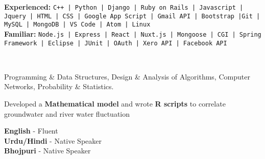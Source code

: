 \documentclass[8pt]{developercv} %
\begin{document}
\begin{minipage}[t]{1\textwidth} %
	\vspace{-\baselineskip} %
\textbf{Experienced:} \texttt{C++ | Python | Django | Ruby on Rails | Javascript | Jquery | HTML | CSS | Google App Script | Gmail API | Bootstrap |Git | MySQL | MongoDB | VS Code | Atom | Linux } \\
\textbf{Familiar:} \texttt{Node.js | Express | React | Nuxt.js | Mongoose | CGI | Spring Framework | Eclipse | JUnit | OAuth | Xero API | Facebook API}%
\end{minipage}\\

\begin{minipage}[t]{0.3\textwidth}
	\vspace{-\baselineskip} %

	
	Programming \& Data Structures, Design \& Analysis of Algorithms, Computer Networks, Probability \& Statistics.
\end{minipage}
\hfill
\begin{minipage}[t]{0.3\textwidth}
	\vspace{-\baselineskip} %
	
	
	Developed a \textbf{Mathematical model} and wrote \textbf{R scripts} to correlate groundwater and river water fluctuation
\end{minipage}
\hfill
\begin{minipage}[t]{0.3\textwidth}
	\vspace{-\baselineskip} %

	
	\textbf{English} - Fluent\\
	\textbf{Urdu/Hindi} - Native Speaker\\
	\textbf{Bhojpuri} - Native Speaker
\end{minipage}

\end{document}
